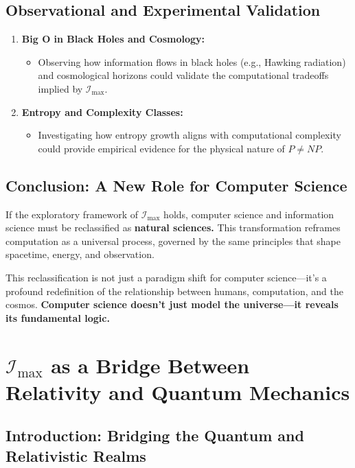 \documentclass[12pt]{article}
\begin{document}
\subsection{Observational and Experimental Validation}

\begin{enumerate}
    \item \textbf{Big O in Black Holes and Cosmology:}
    \begin{itemize}
        \item Observing how information flows in black holes (e.g., Hawking radiation) and cosmological horizons could validate the computational tradeoffs implied by $\mathcal{I}_{\text{max}}$.
    \end{itemize}

    \item \textbf{Entropy and Complexity Classes:}
    \begin{itemize}
        \item Investigating how entropy growth aligns with computational complexity could provide empirical evidence for the physical nature of $P \neq NP$.
    \end{itemize}
\end{enumerate}

\subsection{Conclusion: A New Role for Computer Science}

If the exploratory framework of $\mathcal{I}_{\text{max}}$ holds, computer science and information science must be reclassified as \textbf{natural sciences.} This transformation reframes computation as a universal process, governed by the same principles that shape spacetime, energy, and observation.

This reclassification is not just a paradigm shift for computer science—it’s a profound redefinition of the relationship between humans, computation, and the cosmos. \textbf{Computer science doesn’t just model the universe—it reveals its fundamental logic.}


\section{\(\mathcal{I}_{\text{max}}\) as a Bridge Between Relativity and Quantum Mechanics}

\subsection{Introduction: Bridging the Quantum and Relativistic Realms}
\end{document}
